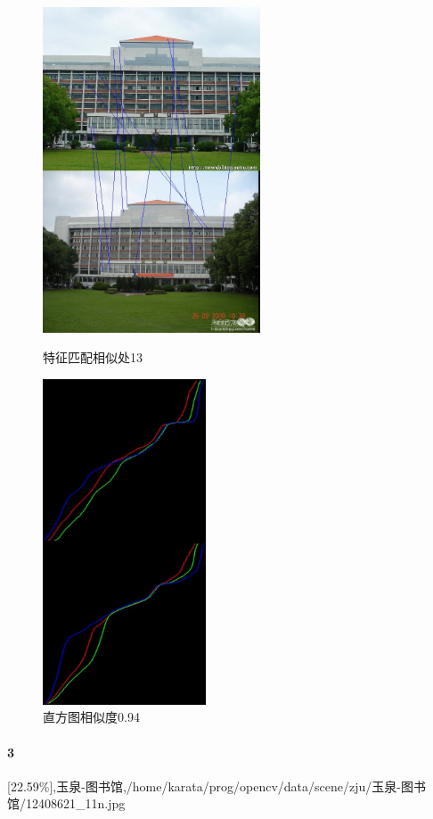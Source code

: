 \begin{figure}[htb]
\begin{minipage}[t]{0.5\linewidth}
\centering
\includegraphics[height=3.8in]{玉泉图书馆.jpg.d/im2sift.jpg}
\caption{特征匹配相似处13}
\label{fig:side:a}
\end{minipage}%
\begin{minipage}[t]{0.5\linewidth}
\centering
\includegraphics[height=3.8in]{玉泉图书馆.jpg.d/im2hist2.jpg}
\caption{直方图相似度0.94}
\label{fig:side:a}
\end{minipage}%
\end{figure}

\paragraph{3}
[22.59\%],玉泉-图书馆,/home/karata/prog/opencv/data/scene/zju/玉泉-图书馆/12408621\_11n.jpg

